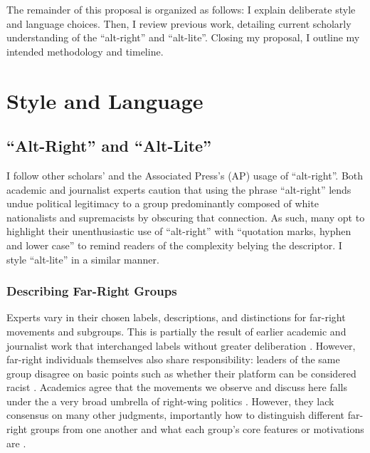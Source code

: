 \documentclass[acmlarge, screen, authorversion]{acmart}
\begin{document}
\medskip

The remainder of this proposal is organized as follows: I explain deliberate style and language
choices. Then, I review previous work, detailing current scholarly understanding of the “alt-right”
and “alt-lite”. Closing my proposal, I outline my intended methodology and timeline.

\section{Style and Language}

\subsection{“Alt-Right” and “Alt-Lite”}

I follow other scholars’ \cite{hartzellAltWhiteConceptualizingAltRight, massanariRethinkingResearchEthics2018} and the
Associated Press’s (AP) \cite{johndaniszewskiWritingAltright2016} usage of “alt-right”.
Both academic and journalist experts caution that using the
phrase “alt-right” lends undue political legitimacy to a group predominantly
composed of white nationalists and supremacists by obscuring that
connection. As such, many opt to highlight their unenthusiastic use of
“alt-right” with “quotation marks, hyphen and lower case”
\cite{johndaniszewskiWritingAltright2016} to remind readers of the complexity belying the
descriptor. I style “alt-lite” in a similar manner.

\subsubsection{Describing Far-Right Groups}

Experts vary in their chosen labels, descriptions, and distinctions for far-right movements and
subgroups. This is partially the result of earlier academic and journalist work
that interchanged labels without greater deliberation
\cite{muddeFarRightToday2019}. However,
far-right individuals themselves also share responsibility:
leaders of the same group disagree on basic points
such as whether their platform can be considered racist \cite{muddeFarRightToday2019}.
Academics agree that the movements we observe and discuss here falls under the a very broad umbrella of right-wing politics \cite{muddeFarRightToday2019}. However, they lack consensus on many other judgments, importantly how to distinguish different far-right groups from one another and what each group's core features or motivations are \cite{muddeFarRightToday2019}.
\end{document}
